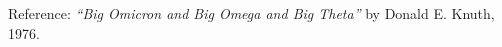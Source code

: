 \begin{frame}{}
\end{frame}

\begin{frame}{}

  \begin{alertblock}{Reference:}
    {\it ``Big Omicron and Big Omega and Big Theta''} by Donald E. Knuth, 1976.
  \end{alertblock}
\end{frame}
